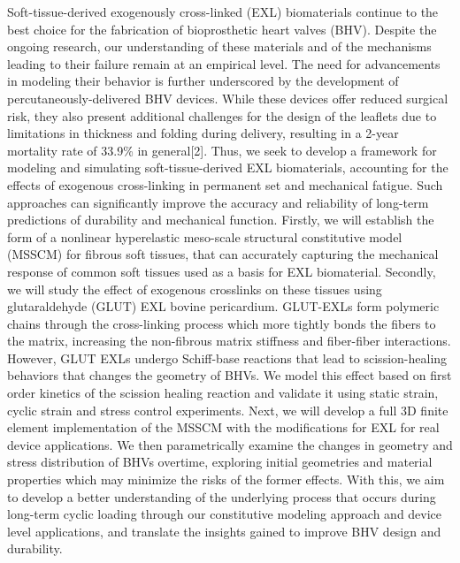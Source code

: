 \documentclass[12pt]{report}
\begin{document}
\utabstract
{}%
\indent
Soft-tissue-derived exogenously cross-linked (EXL) biomaterials continue to the best choice for the fabrication of bioprosthetic heart valves (BHV). Despite the ongoing research, our understanding of these materials and of the mechanisms leading to their failure remain at an empirical level. The need for advancements in modeling their behavior is further underscored by the development of percutaneously-delivered BHV devices. While these devices offer reduced surgical risk, they also present additional challenges for the design of the leaflets due to limitations in thickness and folding during delivery, resulting in a 2-year mortality rate of 33.9\% in general[2]. Thus, we seek to develop a framework for modeling and simulating soft-tissue-derived EXL biomaterials, accounting for the effects of exogenous cross-linking in permanent set and mechanical fatigue. Such approaches can significantly improve the accuracy and reliability of long-term predictions of durability and mechanical function. Firstly, we will establish the form of a nonlinear hyperelastic meso-scale structural constitutive model (MSSCM) for fibrous soft tissues, that can accurately capturing the mechanical response of common soft tissues used as a basis for EXL biomaterial. Secondly, we will study the effect of exogenous crosslinks on these tissues using glutaraldehyde (GLUT) EXL bovine pericardium. GLUT-EXLs form polymeric chains through the cross-linking process which more tightly bonds the fibers to the matrix, increasing the non-fibrous matrix stiffness and fiber-fiber interactions.  However, GLUT EXLs undergo Schiff-base reactions that lead to scission-healing behaviors that changes the geometry of BHVs. We model this effect based on first order kinetics of the scission healing reaction and validate it using static strain, cyclic strain and stress control experiments. Next, we will develop a full 3D finite element implementation of the MSSCM with the modifications for EXL for real device applications. We then parametrically examine the changes in geometry and stress distribution of BHVs overtime, exploring initial geometries and material properties which may minimize the risks of the former effects. With this, we aim to develop a better understanding of the underlying process that occurs during long-term cyclic loading through our constitutive modeling approach and device level applications, and translate the insights gained to improve BHV design and durability. 
 
\tableofcontents{}
\end{document}
